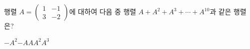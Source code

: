 \hspace*{2mm}\begin{minipage}[t]{\dimexpr\linewidth-2mm\relax}\vspace{0pt}
행렬 $A=\begin{pmatrix} 1 & -1 \\ 3 & -2 \end{pmatrix}$에 대하여 다음 중 행렬 $A+A^2+A^3+\cdots+A^{10}$과 같은 행렬은?
\begin{choices32}{$-A^2$}{$-A$}{$A$}{$A^2$}{$A^3$}\end{choices32}\end{minipage}
